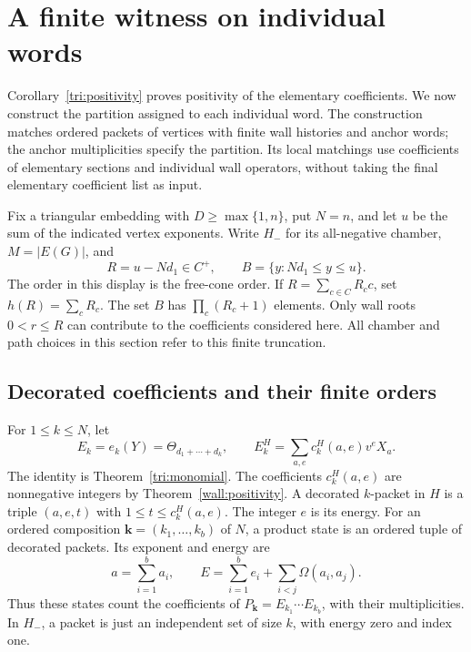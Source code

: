 \section{A finite witness on individual words}
\label{route:section}

Corollary~\ref{tri:positivity} proves positivity of the elementary
coefficients. We now construct the partition assigned to each individual
word. The construction matches ordered packets of vertices with finite
wall histories and anchor words; the anchor multiplicities specify the
partition. Its local matchings use coefficients of elementary sections
and individual wall operators, without taking the final elementary
coefficient list as input.

Fix a triangular embedding with $D\geq\max\{1,n\}$, put $N=n$, and
let $u$ be the sum of the indicated vertex exponents.  Write $H_-$ for its all-negative chamber,
$M=|E(G)|$, and
\[
 R=u-Nd_1\in C^+,
 \qquad B=\{y:Nd_1\leq y\leq u\}.
\]
The order in this display is the free-cone order.  If
$R=\sum_{c\in C}R_c c$, set $h(R)=\sum_c R_c$.
The set $B$ has $\prod_c(R_c+1)$ elements.  Only wall roots $0<r\leq R$
can contribute to the coefficients considered here.  All chamber and
path choices in this section refer to this finite truncation.

\subsection{Decorated coefficients and their finite orders}
\label{route:decorations}

For $1\leq k\leq N$, let
\[
 E_k=e_k(Y)=\Theta_{d_1+\cdots+d_k},
 \qquad E_k^H=\sum_{a,e}c_k^H(a,e)v^eX_a.
\]
The identity is Theorem~\ref{tri:monomial}.  The coefficients
$c_k^H(a,e)$ are nonnegative integers by Theorem~\ref{wall:positivity}.
A decorated $k$-packet in $H$ is a triple $(a,e,t)$ with
$1\leq t\leq c_k^H(a,e)$.  The integer $e$ is its energy.  For an ordered
composition ${\boldsymbol k}=(k_1,\ldots,k_b)$ of $N$, a product state is
an ordered tuple of decorated packets.  Its exponent and energy are
\begin{equation}
 \label{route:product-energy}
 a=\sum_{i=1}^b a_i,
 \qquad
 E=\sum_{i=1}^b e_i+\sum_{i<j}\Omega(a_i,a_j).
\end{equation}
Thus these states count the coefficients of $P_{\boldsymbol k}
=E_{k_1}\cdots E_{k_b}$, with their multiplicities.  In $H_-$, a packet
is just an independent set of size $k$, with energy zero and index one.

